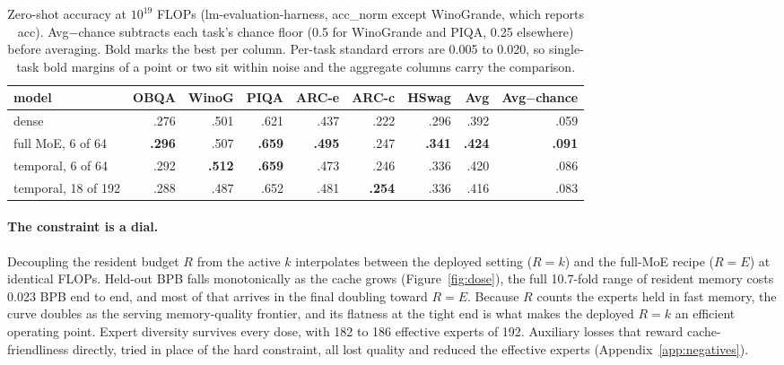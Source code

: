 \documentclass{article}
\begin{document}
\begin{table}[t]
  \centering\small
  \caption{Zero-shot accuracy at $10^{19}$ FLOPs (lm-evaluation-harness, acc\_norm except
  WinoGrande, which reports acc). Avg$-$chance subtracts each task's chance floor (0.5 for
  WinoGrande and PIQA, 0.25 elsewhere) before averaging. Bold marks the best per column.
  Per-task standard errors are 0.005 to 0.020, so single-task bold margins of a point or two
  sit within noise and the aggregate columns carry the comparison.}
  \label{tab:lmeval}
  \vspace{4pt}
  \begin{tabular}{@{}lrrrrrrrr@{}}
    \toprule
    model & OBQA & WinoG & PIQA & ARC-e & ARC-c & HSwag & Avg & Avg$-$chance \\
    \midrule
    dense                 & .276 & .501 & .621 & .437 & .222 & .296 & .392 & .059 \\
    full MoE, 6 of 64     & \textbf{.296} & .507 & \textbf{.659} & \textbf{.495} & .247 & \textbf{.341} & \textbf{.424} & \textbf{.091} \\
    temporal, 6 of 64     & .292 & \textbf{.512} & \textbf{.659} & .473 & .246 & .336 & .420 & .086 \\
    temporal, 18 of 192   & .288 & .487 & .652 & .481 & \textbf{.254} & .336 & .416 & .083 \\
    \bottomrule
  \end{tabular}
\end{table}

\paragraph{The constraint is a dial.} Decoupling the resident budget $R$ from the active $k$
interpolates between the deployed setting ($R=k$) and the full-MoE recipe ($R=E$) at
identical FLOPs. Held-out BPB falls monotonically as the cache grows (Figure~\ref{fig:dose}),
the full 10.7-fold range of resident memory costs 0.023 BPB end to end, and most of that
arrives in the final doubling toward $R=E$. Because $R$ counts the experts held in fast
memory, the curve doubles as the serving memory-quality frontier, and its flatness at the
tight end is what makes the deployed $R=k$ an efficient operating point. Expert diversity
survives every dose, with 182 to 186 effective experts of 192. Auxiliary losses that reward
cache-friendliness directly, tried in place of the hard constraint, all lost quality and
reduced the effective experts (Appendix~\ref{app:negatives}).
\end{document}
